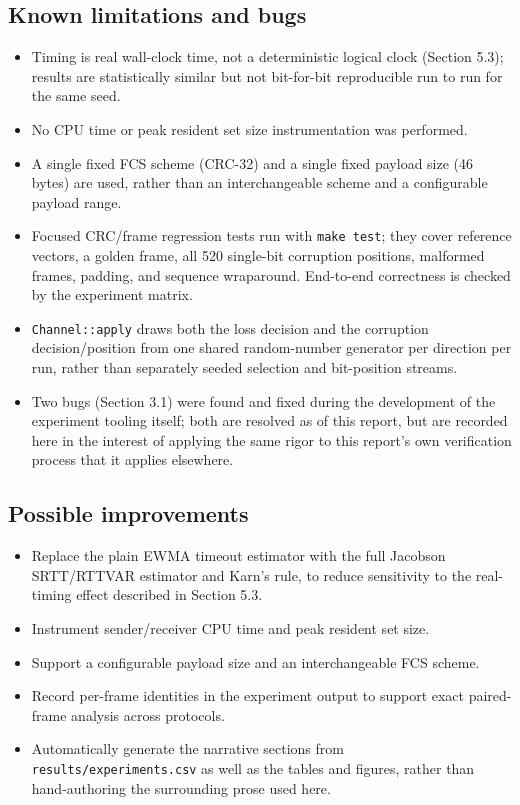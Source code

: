 \documentclass[11pt]{article}
\begin{document}
\subsection{Known limitations and bugs}
\begin{itemize}[nosep]
    \item Timing is real wall-clock time, not a deterministic logical clock (Section 5.3); results are
          statistically similar but not bit-for-bit reproducible run to run for the same seed.
    \item No CPU time or peak resident set size instrumentation was performed.
    \item A single fixed FCS scheme (CRC-32) and a single fixed payload size (46 bytes) are used,
          rather than an interchangeable scheme and a configurable payload range.
    \item Focused CRC/frame regression tests run with \texttt{make test}; they cover reference
          vectors, a golden frame, all 520 single-bit corruption positions, malformed frames, padding,
          and sequence wraparound. End-to-end correctness is checked by the experiment matrix.
    \item \texttt{Channel::apply} draws both the loss decision and the corruption decision/position from
          one shared random-number generator per direction per run, rather than separately seeded
          selection and bit-position streams.
    \item Two bugs (Section 3.1) were found and fixed during the development of the experiment
          tooling itself; both are resolved as of this report, but are recorded here in the interest of
          applying the same rigor to this report's own verification process that it applies elsewhere.
\end{itemize}

\subsection{Possible improvements}
\begin{itemize}[nosep]
    \item Replace the plain EWMA timeout estimator with the full Jacobson SRTT/RTTVAR estimator
          and Karn's rule, to reduce sensitivity to the real-timing effect described in Section 5.3.
    \item Instrument sender/receiver CPU time and peak resident set size.
    \item Support a configurable payload size and an interchangeable FCS scheme.
    \item Record per-frame identities in the experiment output to support exact paired-frame analysis
          across protocols.
    \item Automatically generate the narrative sections from \texttt{results/experiments.csv} as well
          as the tables and figures, rather than hand-authoring the surrounding prose used here.
\end{itemize}
\end{document}
